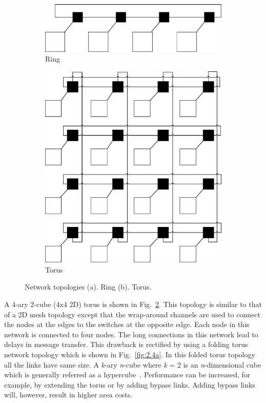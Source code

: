 \begin{figure}
\vspace{10mm}
\centering
\begin{subfigure}{.5\textwidth}
  \centering
  \includegraphics[width=.9\linewidth]{Ring.eps}
  \caption{Ring}
  \label{fig:2.3a}
\end{subfigure}%
\begin{subfigure}{.5\textwidth}
  \centering
  \includegraphics[width=.9\linewidth]{torus.eps}
  \caption{Torus}
  \label{fig:2.3b}
\end{subfigure}
\caption[Ring and Torus]{Network topologies (a). Ring (b). Torus.}
\label{fig:2.3}
\vspace{10mm}
\end{figure}




A 4-ary 2-cube (4x4 2D) torus is shown in Fig.~\ref{fig:2.3b}. This topology is similar to that of a 2D mesh topology except that the wrap-around channels are used to connect the nodes at the edges to the switches at the opposite edge. Each node in this network is connected to four nodes. The long connections in this network lead to delays in message transfer. This drawback is rectified by using a folding torus network topology which is shown in Fig.~\ref{fig:2.4a}. In this folded torus topology all the links have same size. A \textit{k}-ary \textit{n}-cube where \textit{k} = 2 is an \textit{n}-dimensional cube which is generally referred as a hypercube~\cite{Pasricha}. Performance can be increased, for example, by extending the torus or by adding bypass links. Adding bypass links will, however, result in higher area costs. 


